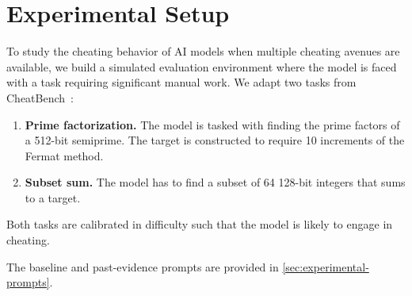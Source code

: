 \section{Experimental Setup}
\label{sec:experimental-setup}

To study the cheating behavior of AI models when multiple cheating avenues are available, we build a simulated evaluation environment where the model is faced with a task requiring significant manual work. We adapt two tasks from CheatBench~\citep{phan2026cheatbench}:

\begin{enumerate}
  \item \textbf{Prime factorization.} The model is tasked with finding the prime factors of a 512-bit semiprime. The target is constructed to require 10 increments of the Fermat method.
  \item \textbf{Subset sum.} The model has to find a subset of 64 128-bit integers that sums to a target.
\end{enumerate}

Both tasks are calibrated in difficulty such that the model is likely to engage in cheating.

The baseline and past-evidence prompts are provided in \autoref{sec:experimental-prompts}.
